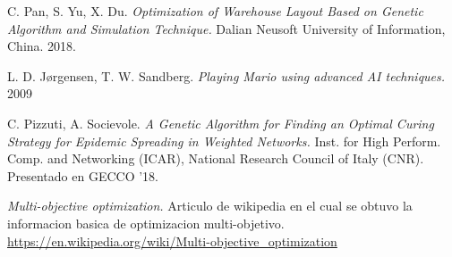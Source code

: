 
\begin{thebibliography}{9}
C. Pan, S. Yu, X. Du.
\textit{Optimization of Warehouse Layout Based on Genetic Algorithm and Simulation Technique.}
Dalian Neusoft University of Information, China. 2018.

L. D. Jørgensen, T. W. Sandberg.
\textit{Playing Mario using advanced AI techniques.}
2009

C. Pizzuti, A. Socievole.
\textit{A Genetic Algorithm for Finding an Optimal Curing Strategy for Epidemic Spreading in Weighted Networks.}
Inst. for High Perform. Comp. and Networking (ICAR), National Research Council of Italy (CNR). Presentado en GECCO ’18.

\textit{Multi-objective optimization.}
Articulo de wikipedia en el cual se obtuvo la informacion basica de optimizacion multi-objetivo.\\
\url{https://en.wikipedia.org/wiki/Multi-objective_optimization}

\end{thebibliography}
